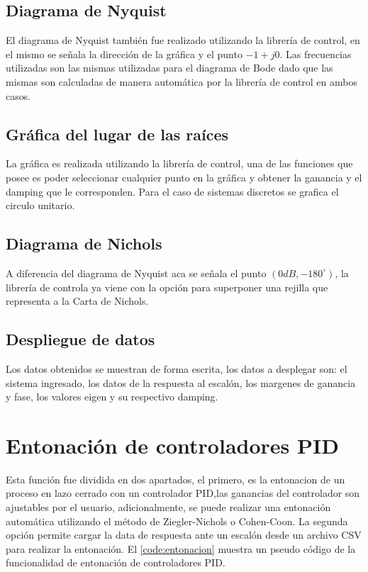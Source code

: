    \subsection{Diagrama de Nyquist}
        
        El diagrama de Nyquist también fue realizado utilizando la librería de control, en el mismo se señala la dirección de la gráfica y el punto $-1 + j0$. Las frecuencias utilizadas son las mismas utilizadas para el diagrama de Bode dado que las mismas son calculadas de manera automática por la librería de control en ambos casos.
    
    \subsection{Gráfica del lugar de las raíces}
        
        La gráfica es realizada utilizando la librería de control, una de las funciones que posee es poder seleccionar cualquier punto en la gráfica y obtener la ganancia y el damping que le corresponden. Para el caso de sistemas discretos se grafica el circulo unitario.
    
    \subsection{Diagrama de Nichols}
        
        A diferencia del diagrama de Nyquist aca se señala el punto $(0dB, -180^\circ)$, la librería de controla ya viene con la opción para superponer una rejilla que representa a la Carta de Nichols.

    \subsection{Despliegue de datos}
        
        Los datos obtenidos se muestran de forma escrita, los datos a desplegar son: el sistema ingresado, los datos de la respuesta al escalón, los margenes de ganancia y fase, los valores eigen y su respectivo damping.

\section{Entonación de controladores PID}

    Esta función fue dividida en dos apartados, el primero, es la entonacion de un proceso en lazo cerrado con un controlador PID,las ganancias del controlador son ajustables por el usuario, adicionalmente, se puede realizar una entonación automática utilizando el método de Ziegler-Nichols o Cohen-Coon. La segunda opción permite cargar la data de respuesta ante un escalón desde un archivo CSV para realizar la entonación. El \cref{code:entonacion} muestra un pseudo código de la funcionalidad de entonación de controladores PID.
    
